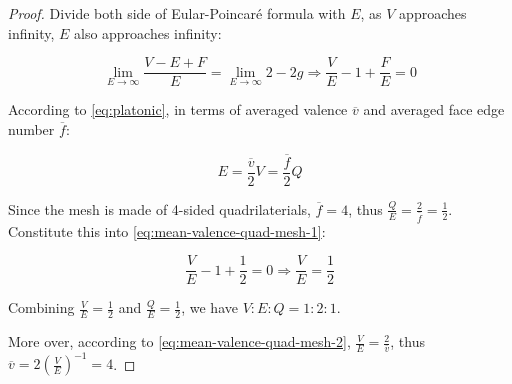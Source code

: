 \begin{proof}
    Divide both side of Eular-Poincar\'e formula with $E$, as $V$ approaches infinity, $E$ also approaches infinity:

    \begin{equation}
        \lim_{E \to \infty} \frac{V - E + F}{E} = \lim_{E \to \infty} 2 - 2g
        \Rightarrow \frac{V}{E} - 1 + \frac{F}{E} = 0
        \label{eq:mean-valence-quad-mesh-1}
    \end{equation}

    According to \autoref{eq:platonic}, in terms of averaged valence $\overline{v}$ and averaged face edge number $\overline{f}$:

    \begin{equation}
        E = \frac{\overline{v}}{2} V = \frac{\overline{f}}{2} Q
        \label{eq:mean-valence-quad-mesh-2}
    \end{equation}

    Since the mesh is made of 4-sided quadrilaterials, $\overline{f} = 4$, thus $\frac{Q}{E} = \frac{2}{\overline{f}} = \frac{1}{2}$. Constitute this into \autoref{eq:mean-valence-quad-mesh-1}:

    \begin{equation}
        \frac{V}{E} - 1 + \frac{1}{2} = 0
        \Rightarrow \frac{V}{E} = \frac{1}{2}
    \end{equation}

    Combining $\frac{V}{E} = \frac{1}{2}$ and $\frac{Q}{E} = \frac{1}{2}$, we have $V:E:Q = 1:2:1$.

    More over, according to \autoref{eq:mean-valence-quad-mesh-2}, $\frac{V}{E} = \frac{2}{\overline{v}}$, thus $\overline{v} = 2(\frac{V}{E})^{-1} = 4$.
\end{proof}

